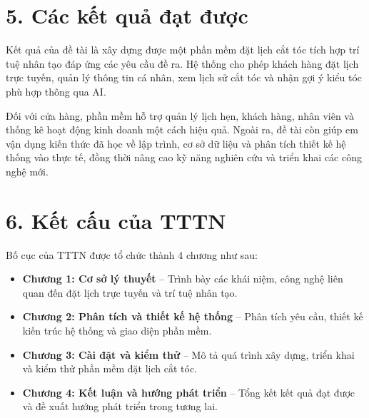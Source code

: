 \section*{5. Các kết quả đạt được}
Kết quả của đề tài là xây dựng được một phần mềm đặt lịch cắt tóc tích hợp trí tuệ nhân tạo đáp ứng các yêu cầu đề ra. Hệ thống cho phép khách hàng đặt lịch trực tuyến, quản lý thông tin cá nhân, xem lịch sử cắt tóc và nhận gợi ý kiểu tóc phù hợp thông qua AI.

Đối với cửa hàng, phần mềm hỗ trợ quản lý lịch hẹn, khách hàng, nhân viên và thống kê hoạt động kinh doanh một cách hiệu quả. Ngoài ra, đề tài còn giúp em vận dụng kiến thức đã học về lập trình, cơ sở dữ liệu và phân tích thiết kế hệ thống vào thực tế, đồng thời nâng cao kỹ năng nghiên cứu và triển khai các công nghệ mới.

\section*{6. Kết cấu của TTTN}
Bố cục của TTTN được tổ chức thành 4 chương như sau:
\begin{itemize}
    \item \textbf{Chương 1: Cơ sở lý thuyết} – Trình bày các khái niệm, công nghệ liên quan đến đặt lịch trực tuyến và trí tuệ nhân tạo.
    \item \textbf{Chương 2: Phân tích và thiết kế hệ thống} – Phân tích yêu cầu, thiết kế kiến trúc hệ thống và giao diện phần mềm.
    \item \textbf{Chương 3: Cài đặt và kiểm thử} – Mô tả quá trình xây dựng, triển khai và kiểm thử phần mềm đặt lịch cắt tóc.
    \item \textbf{Chương 4: Kết luận và hướng phát triển} – Tổng kết kết quả đạt được và đề xuất hướng phát triển trong tương lai.
\end{itemize}
